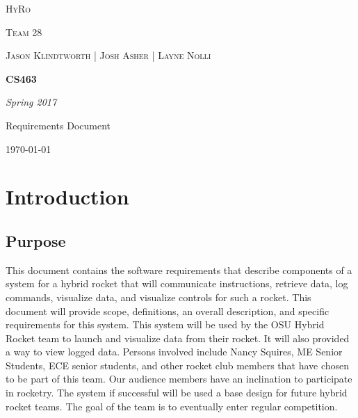 \documentclass[10pt,draftclsnofoot,onecolumn,compsoc]{IEEEtran}
\begin{document}
\begin{titlepage}
	\centering
	{\scshape\LARGE HyRo \par}
	{\scshape\LARGE Team 28\par}
	\vspace{1cm}
	{\scshape\Large Jason Klindtworth  |  Josh Asher  |   Layne Nolli}
	\noindent\makebox[\linewidth]{\rule{17cm}{2pt}}
	\vspace{1cm}
	{\huge\bfseries CS463\par}
	\vspace{2cm}
	{\Large\itshape Spring 2017\par}
	\vspace{4cm}
	{\large Requirements Document\par}\vspace{8cm}
	\noindent\makebox[\linewidth]{\rule{17cm}{2pt}}
	\vfill

	{\large \today\par}
\end{titlepage}


\setcounter{tocdepth}{2}
\tableofcontents

\section{ Introduction}
\subsection{Purpose}
  This document contains the software requirements that describe components of a system for a hybrid rocket that will communicate instructions, retrieve data, log commands, visualize data, and visualize controls for such a rocket.  This document will provide scope, definitions, an overall description, and specific requirements for this system. This system will be used by the OSU Hybrid Rocket team to launch and visualize data from their rocket. It will also provided a way to view logged data. Persons involved include Nancy Squires, ME Senior Students, ECE senior students, and other rocket club members that have chosen to be part of this team. Our audience members have an inclination to participate in rocketry. The system if successful will be used a base design for future hybrid rocket teams. The goal of the team is to eventually enter regular competition.
\end{document}
